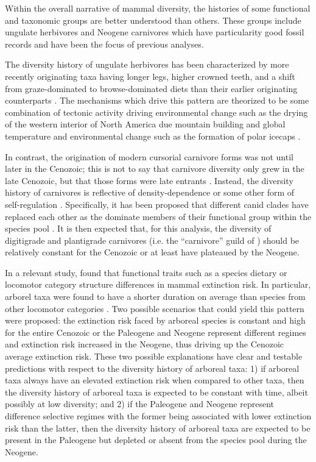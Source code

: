 \documentclass[12pt,letterpaper]{article}
\begin{document}
Within the overall narrative of mammal diversity, the histories of some functional and taxonomic groups are better understood than others. These groups include ungulate herbivores and Neogene carnivores which have particularity good fossil records and have been the focus of previous analyses.

The diversity history of ungulate herbivores has been characterized by more recently originating taxa having longer legs, higher crowned teeth, and a shift from graze-dominated to browse-dominated diets than their earlier originating counterparts \citep{Janis2004,Janis2000,Janis1993b,Janis2008a,Cantalapiedra2017,Fraser2015a}. The mechanisms which drive this pattern are theorized to be some combination of tectonic activity driving environmental change such as the drying of the western interior of North America due mountain building and global temperature and environmental change such as the formation of polar icecaps \citep{Janis2008a,Eronen2015,Blois2009,Badgley2017}. 

In contrast, the origination of modern cursorial carnivore forms was not until later in the Cenozoic; this is not to say that carnivore diversity only grew in the late Cenozoic, but that those forms were late entrants \citep{Janis1993c}. Instead, the diversity history of carnivores is reflective of density-dependence or some other form of self-regulation \citep{Valkenburgh1999,Silvestro2015b,Slater2015c}. Specifically, it has been proposed that different canid clades have replaced each other as the dominate members of their functional group within the species pool \citep{Silvestro2015b,Valkenburgh1999}. It is then expected that, for this analysis, the diversity of digitigrade and plantigrade carnivores (i.e. the ``carnivore'' guild of \citet{Valkenburgh1999}) should be relatively constant for the Cenozoic or at least have plateaued by the Neogene.

In a relevant study, \citet{Smits2015b} found that functional traits such as a species dietary or locomotor category structure differences in mammal extinction risk. In particular, arborel taxa were found to have a shorter duration on average than species from other locomotor categories \citep{Smits2015b}. Two possible scenarios that could yield this pattern were proposed: the extinction risk faced by arboreal species is constant and high for the entire Cenozoic or the Paleogene and Neogene represent different regimes and extinction risk increased in the Neogene, thus driving up the Cenozoic average extinction risk. These two possible explanations have clear and testable predictions with respect to the diversity history of arboreal taxa: 1) if arboreal taxa always have an elevated extinction risk when compared to other taxa, then the diversity history of arboreal taxa is expected to be constant with time, albeit possibly at low diversity; and 2) if the Paleogene and Neogene represent difference selective regimes with the former being associated with lower extinction risk than the latter, then the diversity history of arboreal taxa are expected to be present in the Paleogene but depleted or absent from the species pool during the Neogene.
\end{document}
